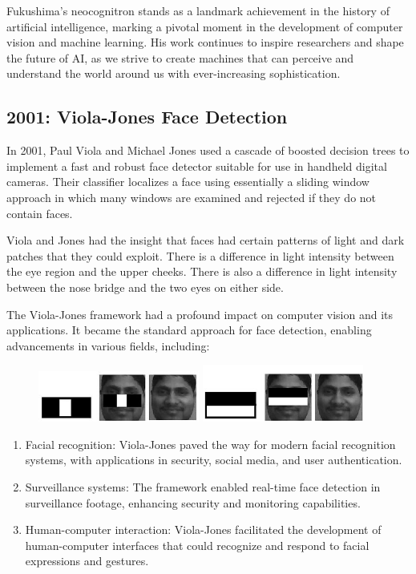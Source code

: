 \documentclass{report}
\begin{document}
Fukushima's neocognitron stands as a landmark achievement in the history of artificial intelligence, marking a pivotal moment in the development of computer vision and machine learning. His work continues to inspire researchers and shape the future of AI, as we strive to create machines that can perceive and understand the world around us with ever-increasing sophistication.

\subsection{2001: Viola-Jones Face Detection}
In 2001, Paul Viola and Michael Jones used a cascade of boosted decision trees to implement a fast and robust face detector suitable for use in handheld digital cameras. Their classifier localizes a face using essentially a sliding window approach in which many windows are examined and rejected if they do not contain faces. 

Viola and Jones had the insight that faces had certain patterns of light and dark patches that they could exploit. There is a difference in light intensity between the eye region and the upper cheeks. There is also a difference in light intensity between the nose bridge and the two eyes on either side.

The Viola-Jones framework had a profound impact on computer vision and its applications. It became the standard approach for face detection, enabling advancements in various fields, including:

\begin{figure}[ht]
	\includegraphics[width=150pt]{24}
	\includegraphics[width=150pt]{25}
	\centering
\end{figure}

\begin{enumerate}
\item Facial recognition: Viola-Jones paved the way for modern facial recognition systems, with applications in security, social media, and user authentication.

\item Surveillance systems: The framework enabled real-time face detection in surveillance footage, enhancing security and monitoring capabilities.

\item Human-computer interaction: Viola-Jones facilitated the development of human-computer interfaces that could recognize and respond to facial expressions and gestures.
\end{enumerate}
\end{document}
